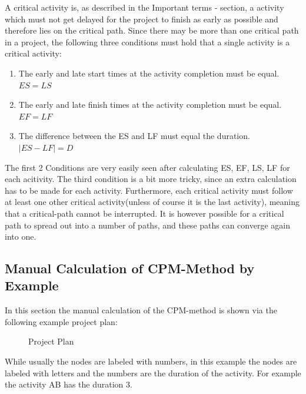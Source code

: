 A critical activity is, as described in the Important terms - section, a activity which must not get delayed for the project to finish as early as possible and therefore lies on the critical path. Since there may be more than one critical path in a project, the following three conditions must hold that a single activity is a critical activity:

\begin{enumerate}
	\item The early and late start times at the activity completion must be equal. $ ES = LS $
	\item The early and late finish times at the activity completion must be equal. $ EF = LF $
	\item The difference between the ES and LF must equal the duration. $ |ES - LF| = D $
\end{enumerate}

The first 2 Conditions are very easily seen after calculating ES, EF, LS, LF for each acitivity. The third condition is a bit more tricky, since an extra calculation has to be made for each activity.
Furthermore, each critical activity must follow at least one other critical activity(unless of course it is the last activity), meaning that a critical-path cannot be interrupted. It is however possible for a critical path to spread out into a number of paths, and these paths can converge again into one.



\subsection{Manual Calculation of CPM-Method by Example}
In this section the manual calculation of the CPM-method is shown via the following example project plan:
\begin{figure}[h] 
\centerline{}
\caption{Project Plan}
\label{pic:plan1}
\end{figure}
While usually the nodes are labeled with numbers, in this example the nodes are labeled with letters and the numbers are the duration of the activity. For example the activity AB has the duration 3.


